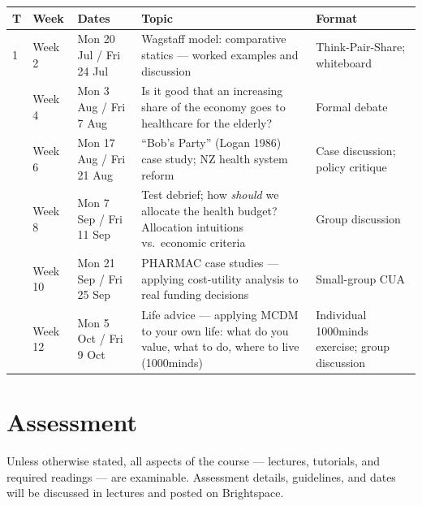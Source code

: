 \documentclass[11pt, a4paper]{article}
\begin{document}
\begin{tabularx}{\textwidth}{@{} C{0.5cm} C{1.3cm} C{2.3cm} X L{2.6cm} @{}}
\toprule
\textbf{T} & \textbf{Week} & \textbf{Dates} & \textbf{Topic} & \textbf{Format} \\
 & Week 2 & Mon 20 Jul / Fri 24 Jul & Wagstaff model: comparative statics — worked examples and discussion & Think-Pair-Share; whiteboard \\
 & Week 4 & Mon 3 Aug / Fri 7 Aug & Is it good that an increasing share of the economy goes to healthcare for the elderly? & Formal debate \\
 & Week 6 & Mon 17 Aug / Fri 21 Aug & ``Bob's Party'' (Logan 1986) case study; NZ health system reform & Case discussion; policy critique \\
 & Week 8 & Mon 7 Sep / Fri 11 Sep & Test debrief; how \emph{should} we allocate the health budget? Allocation intuitions vs.\ economic criteria & Group discussion \\
 & Week 10 & Mon 21 Sep / Fri 25 Sep & PHARMAC case studies — applying cost-utility analysis to real funding decisions & Small-group CUA \\
 & Week 12 & Mon 5 Oct / Fri 9 Oct & Life advice — applying MCDM to your own life: what do you value, what to do, where to live (1000minds) & Individual 1000minds exercise; group discussion \\
\bottomrule
\end{tabularx}

\section{Assessment}

Unless otherwise stated, all aspects of the course — lectures, tutorials, and required readings — are examinable. Assessment details, guidelines, and dates will be discussed in lectures and posted on Brightspace.
\end{document}
